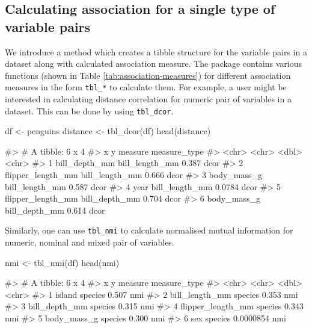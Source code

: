 \hypertarget{calculating-association-for-a-single-type-of-variable-pairs}{%
\subsection{Calculating association for a single type of variable
pairs}\label{calculating-association-for-a-single-type-of-variable-pairs}}

We introduce a method which creates a tibble structure for the variable
pairs in a dataset along with calculated association measure. The
package contains various functions (shown in Table
\ref{tab:association-measures}) for different association measures in
the form \texttt{tbl\_*} to calculate them. For example, a user might be
interested in calculating distance correlation for numeric pair of
variables in a dataset. This can be done by using \texttt{tbl\_dcor}.

\begin{Schunk}
\begin{Sinput}
df <- penguins
distance <- tbl_dcor(df)
head(distance)
\end{Sinput}
\begin{Soutput}
#> # A tibble: 6 x 4
#>   x                 y              measure measure_type
#>   <chr>             <chr>            <dbl> <chr>       
#> 1 bill_depth_mm     bill_length_mm  0.387  dcor        
#> 2 flipper_length_mm bill_length_mm  0.666  dcor        
#> 3 body_mass_g       bill_length_mm  0.587  dcor        
#> 4 year              bill_length_mm  0.0784 dcor        
#> 5 flipper_length_mm bill_depth_mm   0.704  dcor        
#> 6 body_mass_g       bill_depth_mm   0.614  dcor
\end{Soutput}
\end{Schunk}

Similarly, one can use \texttt{tbl\_nmi} to calculate normalised mutual
information for numeric, nominal and mixed pair of variables.

\begin{Schunk}
\begin{Sinput}
nmi <- tbl_nmi(df)
head(nmi)
\end{Sinput}
\begin{Soutput}
#> # A tibble: 6 x 4
#>   x                 y         measure measure_type
#>   <chr>             <chr>       <dbl> <chr>       
#> 1 island            species 0.507     nmi         
#> 2 bill_length_mm    species 0.353     nmi         
#> 3 bill_depth_mm     species 0.315     nmi         
#> 4 flipper_length_mm species 0.343     nmi         
#> 5 body_mass_g       species 0.300     nmi         
#> 6 sex               species 0.0000854 nmi
\end{Soutput}
\end{Schunk}

